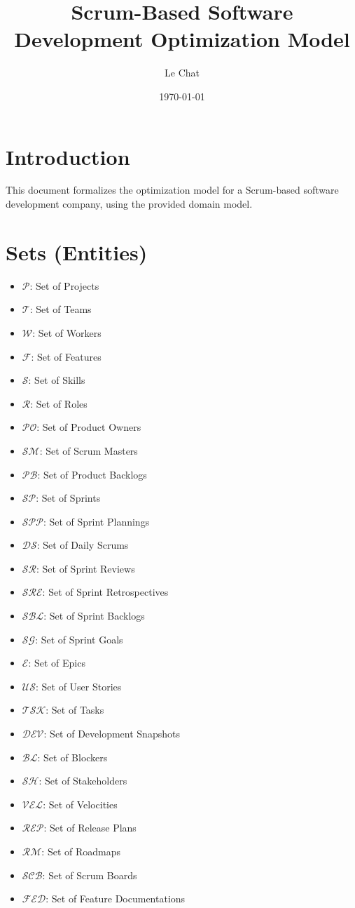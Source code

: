 \documentclass{article}
\title{Scrum-Based Software Development Optimization Model}
\author{Le Chat}
\date{\today}
\begin{document}
\maketitle
\tableofcontents

\section{Introduction}
This document formalizes the optimization model for a Scrum-based software development company, using the provided domain model.

\section{Sets (Entities)}
\begin{itemize}
    \item $\mathcal{P}$: Set of Projects
    \item $\mathcal{T}$: Set of Teams
    \item $\mathcal{W}$: Set of Workers
    \item $\mathcal{F}$: Set of Features
    \item $\mathcal{S}$: Set of Skills
    \item $\mathcal{R}$: Set of Roles
    \item $\mathcal{PO}$: Set of Product Owners
    \item $\mathcal{SM}$: Set of Scrum Masters
    \item $\mathcal{PB}$: Set of Product Backlogs
    \item $\mathcal{SP}$: Set of Sprints
    \item $\mathcal{SPP}$: Set of Sprint Plannings
    \item $\mathcal{DS}$: Set of Daily Scrums
    \item $\mathcal{SR}$: Set of Sprint Reviews
    \item $\mathcal{SRE}$: Set of Sprint Retrospectives
    \item $\mathcal{SBL}$: Set of Sprint Backlogs
    \item $\mathcal{SG}$: Set of Sprint Goals
    \item $\mathcal{E}$: Set of Epics
    \item $\mathcal{US}$: Set of User Stories
    \item $\mathcal{TSK}$: Set of Tasks
    \item $\mathcal{DEV}$: Set of Development Snapshots
    \item $\mathcal{BL}$: Set of Blockers
    \item $\mathcal{SH}$: Set of Stakeholders
    \item $\mathcal{VEL}$: Set of Velocities
    \item $\mathcal{REP}$: Set of Release Plans
    \item $\mathcal{RM}$: Set of Roadmaps
    \item $\mathcal{SCB}$: Set of Scrum Boards
    \item $\mathcal{FED}$: Set of Feature Documentations
\end{itemize}
\end{document}
